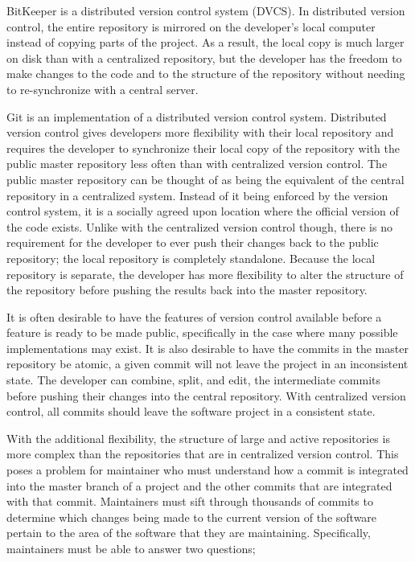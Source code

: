 BitKeeper is a distributed version control system (DVCS). In distributed
version control, the entire repository is mirrored on the developer's
local computer instead of copying parts of the project. As a result, the
local copy is much larger on disk than with a centralized repository,
but the developer has the freedom to make changes to the code and to the
structure of the repository without needing to re-synchronize with a
central server.

Git is an implementation of a distributed version control system.
Distributed version control gives developers more flexibility with their
local repository and requires the developer to synchronize their local
copy of the repository with the public master repository less often
than with centralized version control.
The public master repository can be thought of as being the equivalent
of the central repository in a centralized system.
Instead of it being enforced by the version control system,
it is a socially agreed upon location where the official version of the
code exists.
Unlike with the centralized version control though,
there is no requirement for the developer to ever push their changes
back to the public repository;
the local repository is completely standalone.
Because the local repository is separate, the developer has more
flexibility to alter the structure of the repository before pushing
the results back into the master repository.

It is often desirable to have the features of version control available
before a feature is ready to be made public, specifically in the case
where many possible implementations may exist.
It is also desirable to have the commits in the master repository be
atomic, a given commit will not leave the project in an inconsistent
state.
The developer can combine, split, and edit, the intermediate commits
before pushing their changes into the central repository.
With centralized version control, all commits should leave the software
project in a consistent state.

With the additional flexibility, the structure of large and active
repositories is more complex than the repositories that are in
centralized version control. This poses a problem for maintainer who
must understand how a commit is integrated into the master branch of a
project and the other commits that are integrated with that commit.
Maintainers must sift through thousands of commits to determine which
changes being made to the current version of the software pertain to
the area of the software that they are maintaining.
Specifically, maintainers must be able to answer two questions;

